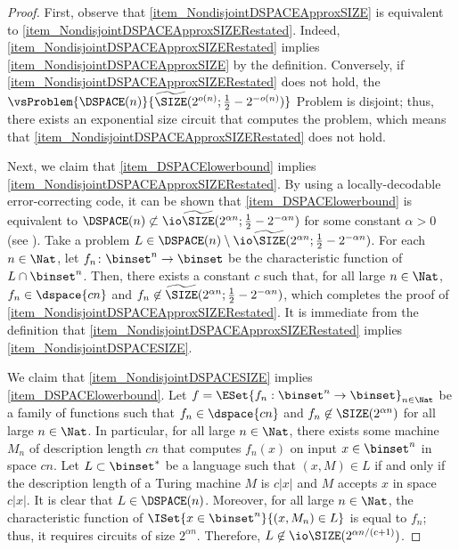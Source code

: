 \documentclass[11pt]{article}
\numberwithin{equation}{section}
\theoremstyle{definition}
\theoremstyle{plain}
\begin{document}
\begin{proof}
  First, observe that \cref{item_NondisjointDSPACEApproxSIZE} is equivalent to \cref{item_NondisjointDSPACEApproxSIZERestated}.
  Indeed, \cref{item_NondisjointDSPACEApproxSIZERestated} implies \cref{item_NondisjointDSPACEApproxSIZE} by the definition.
  Conversely, if \cref{item_NondisjointDSPACEApproxSIZERestated} does not hold,
  the $\vsProblem{\DSPACE(n)}{\widetilde{\SIZE}(2^{o(n)}; \frac{1}{2} - 2^{-o(n)})}$ Problem is disjoint; thus, there exists an exponential size circuit that computes the problem,
  which means that \ref{item_NondisjointDSPACEApproxSIZERestated} does not hold.

  Next, we claim that \cref{item_DSPACElowerbound} implies \cref{item_NondisjointDSPACEApproxSIZERestated}.
  By using a locally-decodable error-correcting code, %
  it can be shown that \cref{item_DSPACElowerbound} is equivalent to $\DSPACE(n) \not\subset \io\widetilde{\SIZE}(2^{\alpha n}; \frac{1}{2} - 2^{- \alpha n})$
  for some constant $\alpha > 0$
  (see  %
  \cite{SudanTV01_jcss_journals, KlivansM02_siamcomp_journals}).
  Take a problem $L \in \DSPACE(n) \setminus \io\widetilde{\SIZE}(2^{\alpha n}; \frac{1}{2} - 2^{- \alpha n})$.
  For each $n \in \Nat$,
  let $f_n \colon \binset^n \to \binset$ be the characteristic function of $L \cap \binset^n$.
  Then,
  there exists a constant $c$ such that, for all large $n \in \Nat$, $f_n \in \dspace{c n}$
  and
  $f_n \not\in \widetilde{\SIZE}(2^{\alpha n}; {\frac{1}{2} - 2^{- \alpha n}})$,
  which completes the proof of \cref{item_NondisjointDSPACEApproxSIZERestated}.
  It is immediate from the definition that \cref{item_NondisjointDSPACEApproxSIZERestated} implies \cref{item_NondisjointDSPACESIZE}.

  We claim that \cref{item_NondisjointDSPACESIZE} implies \cref{item_DSPACElowerbound}.
  Let $f = \ESet{ f_n : \binset^n \to \binset }_{n \in \Nat}$ be a family of functions
  such that
  $f_n \in \dspace{c n}$ and $f_n \not\in \SIZE(2^{\alpha n})$ for all large $n \in \Nat$.
  In particular, for all large $n \in \Nat$, there exists some machine $M_n$ of description length $c n$
  that computes $f_n(x)$ on input $x \in \binset^n$ in space $c n$.
  Let $L \subset \binset^*$ be a language such that $(x, M) \in L$ if and only if
  the description length of a Turing machine $M$ is $c |x|$ and
  $M$ accepts $x$ in space $c |x|$.
  It is clear that $L \in \DSPACE(n)$.
  Moreover, for all large $n \in \Nat$, the characteristic function of $\ISet{ x \in \binset^n }{ (x, M_n) \in L }$
  is equal to $f_n$; thus, it requires circuits of size $2^{\alpha n}$.
  Therefore, $L \not\in \io\SIZE(2^{\alpha n / (c + 1)})$.
\end{proof}
\end{document}
